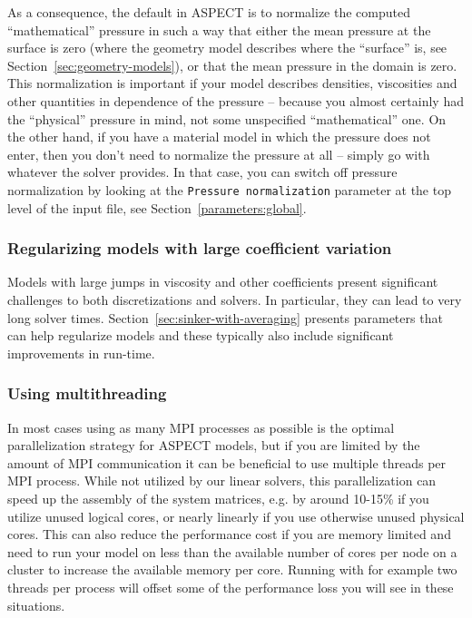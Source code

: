 \documentclass{article}
\newcommand{\aspect}{\textsc{ASPECT}}
\begin{document}
As a consequence, the default in \aspect{} is to normalize the computed
``mathematical'' pressure in such a way that either the mean pressure at the
surface is zero (where the geometry model describes where the ``surface'' is,
see Section~\ref{sec:geometry-models}), or that the mean pressure in the domain
is zero. This normalization is important if your model describes densities,
viscosities and other quantities in dependence of the pressure -- because you
almost certainly had the ``physical'' pressure in mind, not some unspecified
``mathematical'' one. On the other hand, if you have a material model in which
the pressure does not enter, then you don't need to normalize the pressure at
all -- simply go with whatever the solver provides. In that case, you can switch
off pressure normalization by looking at the \texttt{Pressure normalization}
parameter at the top level of the input file, see
Section~\ref{parameters:global}.


\subsubsection{Regularizing models with large coefficient variation}
Models with large jumps in viscosity and other coefficients present
significant challenges to both discretizations and solvers. In particular,
they can lead to very long solver
times. Section~\ref{sec:sinker-with-averaging} presents parameters that can
help regularize models and these typically also include significant
improvements in run-time.


\subsubsection{Using multithreading}
In most cases using as many MPI processes as possible is the optimal
parallelization strategy for \aspect{} models, but if you are limited by the
amount of MPI communication it can be beneficial to use multiple threads per
MPI process. While not utilized by our linear solvers, this parallelization can
speed up the assembly of the system matrices, e.g. by around 10-15\% if you
utilize unused logical cores, or nearly linearly if you use otherwise
unused physical cores. This can also reduce the performance cost if you are
memory limited and need to run your model on less than the available number of
cores per node on a cluster to increase the available memory per core.  Running
with for example two threads per process will offset some of the performance
loss you will see in these situations.
\end{document}
